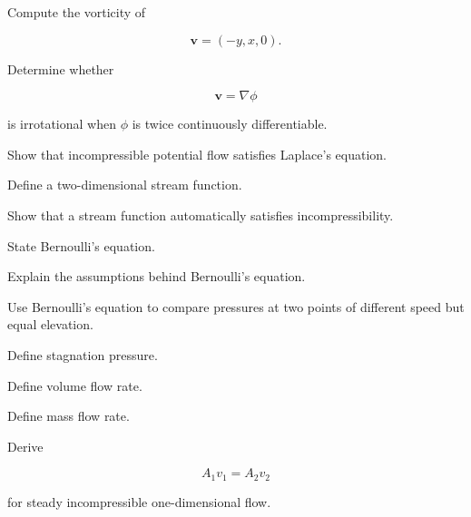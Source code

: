 \begin{exercise}[2]
Compute the vorticity of

\[
\mathbf{v}
=
(-y,x,0).
\]
\end{exercise}

\begin{exercise}[3]
Determine whether

\[
\mathbf{v}
=
\nabla\phi
\]

is irrotational when \(\phi\) is twice continuously differentiable.
\end{exercise}

\begin{exercise}[3]
Show that incompressible potential flow satisfies Laplace's equation.
\end{exercise}

\begin{exercise}[2]
Define a two-dimensional stream function.
\end{exercise}

\begin{exercise}[3]
Show that a stream function automatically satisfies incompressibility.
\end{exercise}

\begin{exercise}[2]
State Bernoulli's equation.
\end{exercise}

\begin{exercise}[2]
Explain the assumptions behind Bernoulli's equation.
\end{exercise}

\begin{exercise}[3]
Use Bernoulli's equation to compare pressures at two points of different
speed but equal elevation.
\end{exercise}

\begin{exercise}[2]
Define stagnation pressure.
\end{exercise}

\begin{exercise}[2]
Define volume flow rate.
\end{exercise}

\begin{exercise}[2]
Define mass flow rate.
\end{exercise}

\begin{exercise}[2]
Derive

\[
A_1v_1=A_2v_2
\]

for steady incompressible one-dimensional flow.
\end{exercise}

